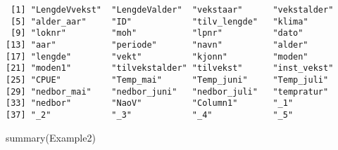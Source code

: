 \documentclass[
]{article}
\newenvironment{Shaded}{\begin{snugshade}}{\end{snugshade}}
\newcommand{\FunctionTok}[1]{\textcolor[rgb]{0.28,0.35,0.67}{#1}}
\newcommand{\NormalTok}[1]{\textcolor[rgb]{0.00,0.23,0.31}{#1}}
\begin{document}
\begin{verbatim}
 [1] "LengdeVvekst"  "LengdeValder"  "vekstaar"      "vekstalder"   
 [5] "alder_aar"     "ID"            "tilv_lengde"   "klima"        
 [9] "loknr"         "moh"           "lpnr"          "dato"         
[13] "aar"           "periode"       "navn"          "alder"        
[17] "lengde"        "vekt"          "kjonn"         "moden"        
[21] "moden1"        "tilvekstalder" "tilvekst"      "inst_vekst"   
[25] "CPUE"          "Temp_mai"      "Temp_juni"     "Temp_juli"    
[29] "nedbor_mai"    "nedbor_juni"   "nedbor_juli"   "tempratur"    
[33] "nedbor"        "NaoV"          "Column1"       "_1"           
[37] "_2"            "_3"            "_4"            "_5"           
\end{verbatim}

\begin{Shaded}
\begin{Highlighting}[]
\FunctionTok{summary}\NormalTok{(Example2)}
\end{Highlighting}
\end{Shaded}
\end{document}

